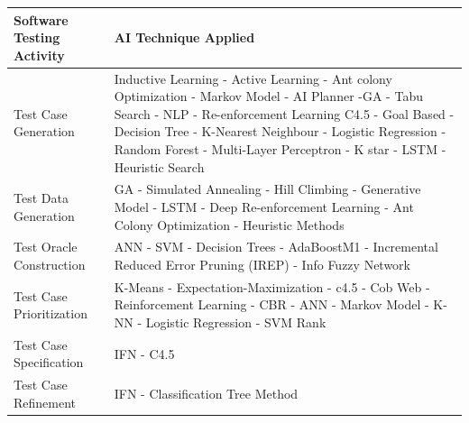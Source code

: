 \documentclass[12pt]{article}
\begin{document}
\begin{table}[]
\begin{tabular}{|p{}|p{}|}
\hline
\textbf{Software Testing Activity} & \textbf{AI Technique Applied}                                                                                                                                                                                                                                                                          \\ \hline
Test Case Generation               & Inductive Learning - Active Learning - Ant colony Optimization - Markov Model - AI Planner -GA - Tabu Search - NLP - Re-enforcement Learning C4.5 - Goal Based - Decision Tree - K-Nearest Neighbour - Logistic Regression - Random Forest - Multi-Layer Perceptron - K star - LSTM - Heuristic Search \\ \hline
Test Data Generation               & GA - Simulated Annealing - Hill Climbing - Generative Model - LSTM - Deep Re-enforcement Learning - Ant Colony Optimization - Heuristic Methods                                                                                                                                                        \\ \hline
Test Oracle Construction           & ANN - SVM - Decision Trees - AdaBoostM1 - Incremental Reduced Error Pruning (IREP) - Info Fuzzy Network                                                                                                                                                                                                \\ \hline
Test Case Prioritization           & K-Means - Expectation-Maximization - c4.5 - Cob Web - Reinforcement Learning - CBR - ANN - Markov Model - K-NN - Logistic Regression - SVM Rank                                                                                                                                                        \\ \hline
Test Case Specification            & IFN - C4.5                                                                                                                                                                                                                                                                                             \\ \hline
Test Case Refinement               & IFN - Classification Tree Method                                                                                                                                                                                                                                                                       \\ \hline

\end{tabular}
\end{table}
\end{document}
